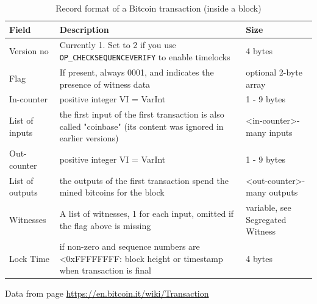 \begin{table}[H]
  \small
  \centering
  \begin{tabularx}{\textwidth}{|l|X|X|}
    \hline
    \textbf{Field}          & \textbf{Description} & \textbf{Size} \\ \hline
    Version no              & Currently 1. Set to 2 if you use \texttt{OP\_CHECKSEQUENCEVERIFY} to enable
    timelocks & 4 bytes \\ \hline
    Flag                    & If present, always 0001, and indicates the presence of witness data
    & optional 2-byte array               \\ \hline
    In-counter              & positive integer VI = VarInt
    & 1 - 9 bytes                         \\ \hline
    List of inputs          & the first input of the first transaction is also called "coinbase" (its content
    was ignored in earlier versions) & \textless in-counter\textgreater-many inputs \\ \hline
    Out-counter             & positive integer VI = VarInt
    & 1 - 9 bytes                         \\ \hline
    List of outputs         & the outputs of the first transaction spend the mined bitcoins for the block
    & \textless out-counter\textgreater-many outputs \\ \hline
    Witnesses               & A list of witnesses, 1 for each input, omitted if the flag above is missing
    & variable, see Segregated Witness    \\ \hline
    Lock Time               & if non-zero and sequence numbers are \textless 0xFFFFFFFF: block height or
    timestamp when transaction is final & 4 bytes                             \\ \hline
  \end{tabularx}
  \caption{Record format of a Bitcoin transaction (inside a block)}
  \label{table:bitcoin_transaction_format}
  \begin{minipage}{\textwidth}
    \begin{center}
      \footnotesize{Data from \cite{BitcoinWiki} page \url{https://en.bitcoin.it/wiki/Transaction}}
    \end{center}
  \end{minipage}
\end{table}

